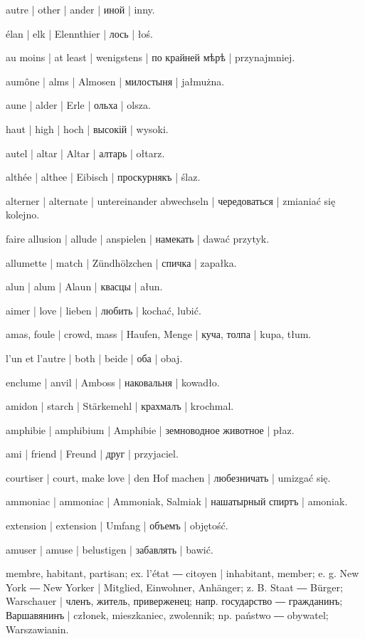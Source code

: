 \begin{outdent}{1em}
autre | other | ander | иной | inny.

élan | elk | Elennthier | лось | łoś.

au moins | at least | wenigstens | по крайней мѣрѣ | przynajmniej.

aumône | alms | Almosen | милостыня | jałmużna.

aune | alder | Erle | ольха | olsza.

haut | high | hoch | высокій | wysoki.

autel | altar | Altar | алтарь | ołtarz.

althée | althee | Eibisch | проскурнякъ | ślaz.

alterner | alternate | untereinander abwechseln | чередоваться | zmianiać się kolejno.

faire allusion | allude | anspielen | намекать | dawać
przytyk.

allumette | match | Zündhölzchen | спичка | zapałka.

alun | alum | Alaun | квасцы | ałun.

aimer | love | lieben | любить | kochać, lubić.

amas, foule | crowd, mass | Haufen, Menge | куча, толпа | kupa, tłum.

l’un et l’autre | both | beide | оба | obaj.

enclume | anvil | Amboss | наковальня | kowadło.

amidon | starch | Stärkemehl | крахмалъ | krochmal.

amphibie | amphibium | Amphibie | земноводное животное | płaz.

ami | friend | Freund | друг | przyjaciel.

courtiser | court, make love | den Hof machen | любезничать | umizgać się.

ammoniac | ammoniac | Ammoniak, Salmiak | нашатырный спиртъ | amoniak.

extension | extension | Umfang | объемъ | objętość.

amuser | amuse | belustigen | забавлять | bawić.

membre, habitant, partisan; ex.  l’état ― 
citoyen | inhabitant, member; e. g.  New York ― 
New Yorker | Mitglied, Einwohner, Anhänger; z. B. 
Staat ―  Bürger;  Warschauer | членъ, житель,
приверженец; напр.  государство ―  гражданинъ;
 Варшавянинъ | członek, mieszkaniec, zwolennik; np. 
państwo ―  obywatel;  Warszawianin.


\end{outdent}
